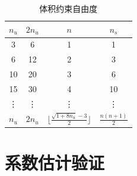 \begin{table}[!h]
    \centering
    \caption{体积约束自由度}\label{ch_3:tab:constraint}
    \setlength{\tabcolsep}{10mm}
    \renewcommand{\arraystretch}{2}
    \begin{tabular}{cccc}
        \toprule
            $n_u$ & $2n_u$ & $n$ &$ n_s$\\
        \midrule
        3  & 6  & 1 & 1 \\
        6  & 12 & 2 & 3 \\
        10 & 20 & 3 & 6 \\
        15 & 30 & 4 & 10 \\
        \vdots & \vdots & \vdots & \vdots \\
        $n_u$ & $2n_u$ & $\lfloor\frac{\sqrt{1+8n_u}-3}{2}\rfloor$ & $\frac{n(n+1)}{2}$  \\
        \bottomrule
    \end{tabular}
\end{table}

\section{系数估计验证}

